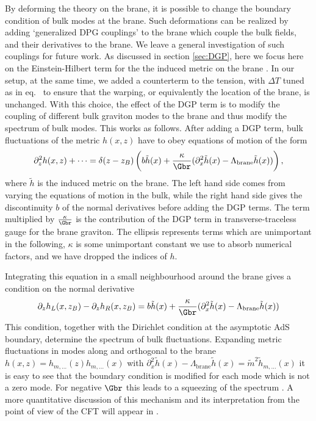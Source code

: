 By deforming the theory on the brane, it is possible to change the boundary condition of bulk modes at the brane. Such deformations can be realized by adding `generalized DPG couplings' to the brane which couple the bulk fields, and their derivatives to the brane. We leave a general investigation of such couplings for future work. As discussed in section \ref{sec:DGP}, here we focus here on the Einstein-Hilbert term  for the the induced metric on the brane \cite{Dvali:2000hr}. In our setup, at the same time, we added a counterterm to the tension, with $\Delta T$ tuned as in eq.~ to ensure that the warping, or equivalently the location of the brane, is unchanged. With this choice, the effect of the DGP term is to modify the coupling of different bulk graviton modes to the brane and thus modify the spectrum of bulk modes. This works as follows. After adding a DGP term, bulk fluctuations of the metric $h(x,z)$ have to obey equations of motion of the form
\begin{align}
\partial^2_z h(x,z) + \dots = \delta(z - z_B) \left(b \tilde h(x) + \frac{\kappa}{\Gbr} ( \partial_x^2 \tilde h(x) - \Lambda_\text{brane} \tilde h(x)) \right),
\end{align}
where $\tilde h$ is the induced metric on the brane. The left hand side comes from varying the equations of motion in the bulk, while the right hand side gives the discontinuity $b$ of the normal derivatives before adding the DGP terms. The term multiplied by $\frac{\kappa}{\Gbr}$ is the contribution of the DGP term in transverse-traceless gauge for the brane graviton. The ellipsis represents terms which are unimportant in the following, $\kappa$ is some unimportant constant we use to absorb numerical factors, and we have dropped the indices of $h$.

Integrating this equation in a small neighbourhood around the brane gives a condition on the normal derivative
\begin{align}
\partial_z h_L(x,z_B) - \partial_z h_R(x,z_B) = b \tilde h(x) + \frac{\kappa}{\Gbr} ( \partial_x^2 \tilde h(x) - \Lambda_\text{brane} \tilde h(x))
\end{align}
This condition, together with the Dirichlet condition at the asymptotic AdS boundary, determine the spectrum of bulk fluctuations. Expanding metric fluctuations in modes along and orthogonal to the brane $h(x,z) = h_{m,\dots}(z)h_{m,\dots}(x)$ with $ \partial_x^2 \tilde h(x) - \Lambda_\text{brane} \tilde h(x) = \tilde m^2 \tilde h_{m,\dots}(x)$ it is easy to see that the boundary condition is modified for each mode which is not a zero mode. For negative $\Gbr$ this leads to a squeezing of the spectrum . A more quantitative discussion of this mechanism and its interpretation from the point of view of the CFT will appear in \cite{domino}.

